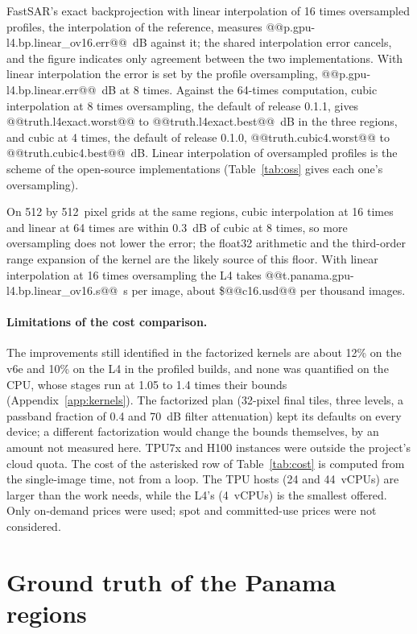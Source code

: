 \documentclass[11pt]{article}
\begin{document}
FastSAR's exact backprojection with linear interpolation of 16 times oversampled profiles, the interpolation of the reference, measures @@p.gpu-l4.bp.linear_ov16.err@@~dB against it; the shared interpolation error cancels, and the figure indicates only agreement between the two implementations. With linear interpolation the error is set by the profile oversampling, @@p.gpu-l4.bp.linear.err@@~dB at 8 times. Against the 64-times computation, cubic interpolation at 8 times oversampling, the default of release 0.1.1, gives @@truth.l4exact.worst@@ to @@truth.l4exact.best@@~dB in the three regions, and cubic at 4 times, the default of release 0.1.0, @@truth.cubic4.worst@@ to @@truth.cubic4.best@@~dB. Linear interpolation of oversampled profiles is the scheme of the open-source implementations (Table~\ref{tab:oss} gives each one's oversampling).

On 512 by 512~pixel grids at the same regions, cubic interpolation at 16 times and linear at 64 times are within 0.3~dB of cubic at 8 times, so more oversampling does not lower the error; the float32 arithmetic and the third-order range expansion of the kernel are the likely source of this floor. With linear interpolation at 16 times oversampling the L4 takes @@t.panama.gpu-l4.bp.linear_ov16.s@@~s per image, about \$@@c16.usd@@ per thousand images.

\paragraph{Limitations of the cost comparison.} The improvements still identified in the factorized kernels are about 12\% on the v6e and 10\% on the L4 in the profiled builds, and none was quantified on the CPU, whose stages run at 1.05 to 1.4 times their bounds (Appendix~\ref{app:kernels}). The factorized plan (32-pixel final tiles, three levels, a passband fraction of 0.4 and 70~dB filter attenuation) kept its defaults on every device; a different factorization would change the bounds themselves, by an amount not measured here. TPU7x and H100 instances were outside the project's cloud quota. The cost of the asterisked row of Table~\ref{tab:cost} is computed from the single-image time, not from a loop. The TPU hosts (24 and 44~vCPUs) are larger than the work needs, while the L4's (4~vCPUs) is the smallest offered. Only on-demand prices were used; spot and committed-use prices were not considered.

\section{Ground truth of the Panama regions}
\label{app:truth}
\end{document}
